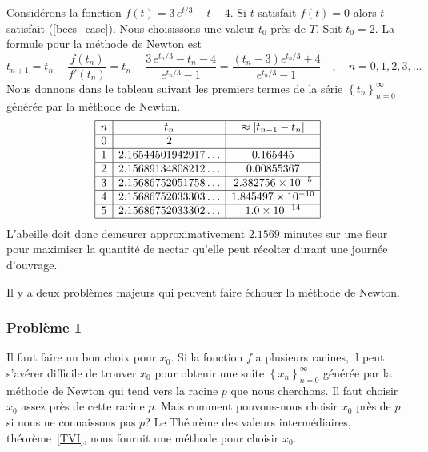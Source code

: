 {\begin{egg}[\life]
Considérons la fonction $f(t) = 3\,e^{t/3} - t - 4$.  Si $t$ satisfait
$f(t)=0$ alors $t$ satisfait (\ref{bees_case}).  Nous choisissons une valeur
$t_0$ près de $T$.  Soit $t_0 = 2$.  La
formule pour la méthode de Newton est
\[
t_{n+1} = t_n - \frac{f(t_n)}{f'(t_n)}
= t_n - \frac{3\,e^{t_n/3} - t_n - 4}{e^{t_n/3} - 1}
= \frac{(t_n - 3)e^{t_n/3}+4}{e^{t_n/3}-1} \quad , \quad
n=0,1,2,3,\ldots 
\]
Nous donnons dans le tableau suivant les premiers termes de la série
$\displaystyle \left\{t_n\right\}_{n=0}^\infty$ générée par la méthode
de Newton.
\[
\begin{array}{|c|c|c|}
\hline
n & t_n & \approx |t_{n-1}-t_n| \\ \hline
0 & 2 & \\ \hline
1 & 2.16544501942917\ldots & 0.165445 \\ \hline
2 & 2.15689134808212\ldots & 0.00855367 \\ \hline
3 & 2.15686752051758\ldots & 2.382756\times 10^{-5} \\ \hline
4 & 2.15686752033303\ldots & 1.845497\times 10^{-10} \\ \hline
5 & 2.15686752033302\ldots & 1.0\times 10^{-14} \\ \hline
\end{array}
\]
L'abeille doit donc demeurer approximativement $2.1569$ minutes sur
une fleur pour maximiser la quantité de nectar qu'elle peut récolter
durant une journée d'ouvrage.
\end{egg}


Il y a deux problèmes majeurs qui peuvent faire échouer la méthode de
Newton.

\subsubsection{Problème 1}

Il faut faire un bon choix pour $x_0$.  Si
la fonction $f$ a plusieurs racines, il peut s'avérer difficile de
trouver $x_0$ pour obtenir une suite
$\displaystyle \left\{x_n\right\}_{n=0}^\infty$ générée par la 
méthode de Newton qui tend vers la racine $p$ que nous cherchons.  Il
faut choisir $x_0$ assez près de cette racine $p$.  Mais comment
pouvons-nous choisir $x_0$ près de $p$ si nous ne connaissons pas $p$?  Le
Théorème des valeurs intermédiaires, théorème~\ref{TVI}, nous fournit
une méthode pour choisir $x_0$.

}
